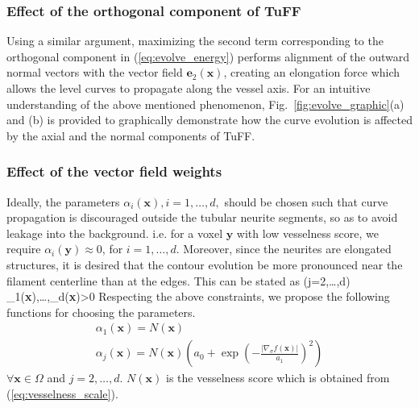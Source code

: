 \subsubsection{Effect of the orthogonal component of TuFF}
Using a similar argument, maximizing the second term corresponding to the orthogonal component in (\ref{eq:evolve_energy}) performs alignment of the outward normal vectors with the  vector field $\textbf{e}_2(\textbf{x})$, creating  an elongation force which allows the level curves to propagate along the vessel axis. For an intuitive understanding of the above mentioned phenomenon, Fig.~\ref{fig:evolve_graphic}(a) and (b) is provided to graphically demonstrate how the curve evolution is affected by the axial and the normal components of TuFF. 

\subsubsection{Effect of the vector field weights}
Ideally, the parameters $\alpha_i(\textbf{x}),i=1,\ldots,d,$ should be chosen such that curve propagation is discouraged outside the tubular neurite segments, so as to avoid leakage into the background. i.e. for a voxel $\textbf{y}$ with low vesselness score,  we require $\alpha_i(\textbf{y})\approx 0$, for $i=1,\ldots,d$. Moreover, since the neurites are elongated structures, it is desired that the contour evolution be more pronounced near the filament centerline than at the edges. This can be stated as 
\bea \label{eq:alpha_ratio}
  \;\; (j=2,\ldots,d)  \;\;\; \;\; \alpha_1(\textbf{x}),\ldots,\alpha_d(\textbf{x})>0
\eea
Respecting the above constraints, we propose the following functions for choosing the parameters.
\begin{gather}
\alpha_1(\textbf{x})=N(\textbf{x})\label{eq:alpha1_choice}\\
\alpha_j(\textbf{x})=N(\textbf{x})\left(a_0+\exp\left(-\frac{|\nabla_{\sigma}f(\textbf{x})|}{a_1}\right)^2\right)
\label{eq:alpha2_choice}
\end{gather}
$\forall \textbf{x}\in\Omega$ and  $j=2,\ldots,d$. $N(\textbf{x})$ is the  vesselness score which is obtained from (\ref{eq:vesselness_scale}). 

